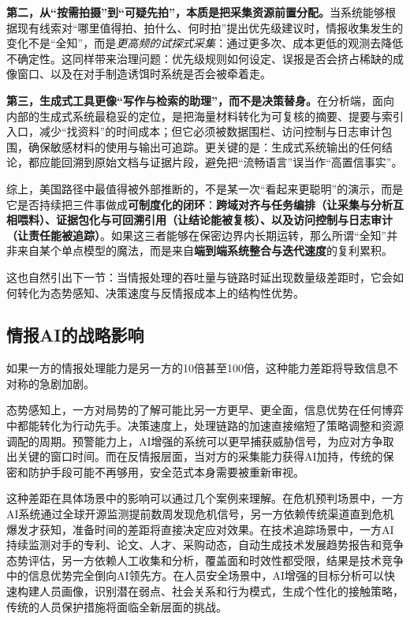         {\bfseries 第二，从“按需拍摄”到“可疑先拍”，本质是把采集资源前置分配。}当系统能够根据现有线索对“哪里值得拍、拍什么、何时拍”提出优先级建议时，情报收集发生的变化不是“全知”，而是\emph{更高频的试探式采集}：通过更多次、成本更低的观测去降低不确定性。这同样带来治理问题：优先级规则如何设定、误报是否会挤占稀缺的成像窗口、以及在对手制造诱饵时系统是否会被牵着走。

        {\bfseries 第三，生成式工具更像“写作与检索的助理”，而不是决策替身。}在分析端，面向内部的生成式系统最稳妥的定位，是把海量材料转化为可复核的摘要、提要与索引入口，减少“找资料”的时间成本；但它必须被数据围栏、访问控制与日志审计包围，确保敏感材料的使用与输出可追踪。更关键的是：生成式系统输出的任何结论，都应能回溯到原始文档与证据片段，避免把“流畅语言”误当作“高置信事实”。

综上，美国路径中最值得被外部推断的，不是某一次“看起来更聪明”的演示，而是它是否持续把三件事做成\textbf{可制度化的闭环}：\textbf{跨域对齐与任务编排（让采集与分析互相喂料）、证据包化与可回溯引用（让结论能被复核）、以及访问控制与日志审计（让责任能被追踪）}。如果这三者能够在保密边界内长期运转，那么所谓“全知”并非来自某个单点模型的魔法，而是来自\textbf{端到端系统整合与迭代速度}的复利累积。

这也自然引出下一节：当情报处理的吞吐量与链路时延出现数量级差距时，它会如何转化为态势感知、决策速度与反情报成本上的结构性优势。

\subsection{情报AI的战略影响}

如果一方的情报处理能力是另一方的10倍甚至100倍，这种能力差距将导致信息不对称的急剧加剧。

态势感知上，一方对局势的了解可能比另一方更早、更全面，信息优势在任何博弈中都能转化为行动先手。决策速度上，处理链路的加速直接缩短了策略调整和资源调配的周期。预警能力上，AI增强的系统可以更早捕获威胁信号，为应对方争取出关键的窗口时间。而在反情报层面，当对方的采集能力获得AI加持，传统的保密和防护手段可能不再够用，安全范式本身需要被重新审视。

这种差距在具体场景中的影响可以通过几个案例来理解。在危机预判场景中，一方AI系统通过全球开源监测提前数周发现危机信号，另一方依赖传统渠道直到危机爆发才获知，准备时间的差距将直接决定应对效果。在技术追踪场景中，一方AI持续监测对手的专利、论文、人才、采购动态，自动生成技术发展趋势报告和竞争态势评估，另一方依赖人工收集和分析，覆盖面和时效性都受限，结果是技术竞争中的信息优势完全倒向AI领先方。在人员安全场景中，AI增强的目标分析可以快速构建人员画像，识别潜在弱点、社会关系和行为模式，生成个性化的接触策略，传统的人员保护措施将面临全新层面的挑战。

